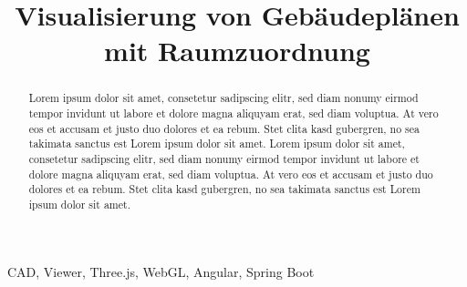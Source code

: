 \documentclass[conference]{IEEEtran}
\begin{document}
    \title{Visualisierung von Gebäudeplänen mit Raumzuordnung}

    \author{
    }

    \maketitle

    \begin{abstract}
        Lorem ipsum dolor sit amet, consetetur sadipscing elitr, sed diam nonumy eirmod tempor invidunt ut labore et dolore magna aliquyam erat, sed diam voluptua. At vero eos et accusam et justo duo dolores et ea rebum. Stet clita kasd gubergren, no sea takimata sanctus est Lorem ipsum dolor sit amet. Lorem ipsum dolor sit amet, consetetur sadipscing elitr, sed diam nonumy eirmod tempor invidunt ut labore et dolore magna aliquyam erat, sed diam voluptua. At vero eos et accusam et justo duo dolores et ea rebum. Stet clita kasd gubergren, no sea takimata sanctus est Lorem ipsum dolor sit amet.
    \end{abstract}

    \vspace{10pt}

    \begin{IEEEkeywords}
        CAD, Viewer, Three.js, WebGL, Angular, Spring Boot
    \end{IEEEkeywords}


    

    

    

    


    
    
\end{document}

